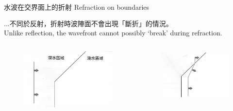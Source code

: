 \documentclass[beamer=true]{standalone}
\begin{document}
\begin{frame}{水波在交界面上的折射 Refraction on boundaries}

    ...不同於反射，折射時波陣面不會出現「斷折」的情況。\\Unlike reflection, the wavefront cannot possibly `break' during refraction.
    \begin{columns}
        \begin{figure}
            \centering
            \includegraphics[width=1\linewidth]{images/Screenshot 2023-09-27 at 8.42.42 PM.png}


        \end{figure}
        \begin{figure}
            \centering
            \includegraphics[width=1\linewidth]{images/Screenshot 2023-09-27 at 8.42.50 PM.png}


        \end{figure}
    \end{columns}
\end{frame}
\end{document}
